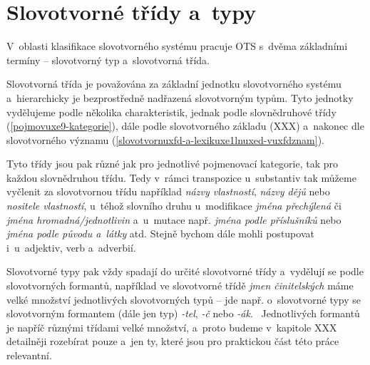 \hypertarget{slovotvornuxe9-tux159uxeddy-a-typy}{%
\section{Slovotvorné třídy
a~typy}\label{slovotvornuxe9-tux159uxeddy-a-typy}}

V~oblasti klasifikace slovotvorného systému pracuje OTS s~dvěma
základními termíny -- slovotvorný typ a~slovotvorná třída.

Slovotvorná třída je považována za základní jednotku slovotvorného
systému a~hierarchicky je bezprostředně nadřazená slovotvorným typům.
Tyto jednotky vydělujeme podle několika charakteristik, jednak podle
slovnědruhové třídy (\ref{pojmovuxe9-kategorie}), dále podle
slovotvorného základu (XXX) a~nakonec dle slovotvorného významu
(\ref{slovotvornuxfd-a-lexikuxe1lnuxed-vuxfdznam}).
\parencite[107]{dokulil00}

Tyto třídy jsou pak různé jak pro jednotlivé pojmenovací kategorie, tak
pro každou slovnědruhou třídu. Tedy v~rámci transpozice u~substantiv tak
můžeme vyčlenit za slovotvornou třídu například \emph{názvy vlastností},
\emph{názvy dějů} nebo \emph{nositele vlastností}, u~téhož slovního
druhu u~modifikace \emph{jména přechýlená} či \emph{jména
hromadná/jednotlivin} a~u~mutace např. \emph{jména podle příslušníků}
nebo \emph{jména podle původu a~látky} atd. Stejně bychom dále mohli
postupovat i~u~adjektiv, verb a~adverbií.

Slovotvorné typy pak vždy spadají do určité slovotvorné třídy a~vydělují
se podle slovotvorných formantů, například ve slovotvorné třídě
\emph{jmen činitelských} máme velké množství jednotlivých slovotvorných
typů -- jde např. o~slovotvorné typy se slovotvorným formantem (dále jen
typ) \emph{-tel}, \emph{-č} nebo \emph{-ák}.~\parencite[108]{dokulil00}
Jednotlivých formantů je napříč různými třídami velké množství, a~proto
budeme v~kapitole XXX detailněji rozebírat pouze a~jen ty, které jsou
pro praktickou část této práce relevantní.

